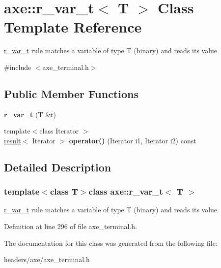 \hypertarget{classaxe_1_1r__var__t}{\section{axe\+:\+:r\+\_\+var\+\_\+t$<$ T $>$ Class Template Reference}
\label{classaxe_1_1r__var__t}
}


\hyperlink{classaxe_1_1r__var__t}{r\+\_\+var\+\_\+t} rule matches a variable of type T (binary) and reads its value  




{\ttfamily \#include $<$axe\+\_\+terminal.\+h$>$}

\subsection*{Public Member Functions}
\begin{DoxyCompactItemize}
\item 
\hypertarget{classaxe_1_1r__var__t_a07b7f7ec78fde92d94e6f348e0de9070}{{\bfseries r\+\_\+var\+\_\+t} (T \&t)}\label{classaxe_1_1r__var__t_a07b7f7ec78fde92d94e6f348e0de9070}

\item 
\hypertarget{classaxe_1_1r__var__t_a4135b872e1ea1353d0cec4cf763c9698}{{\footnotesize template$<$class Iterator $>$ }\\\hyperlink{structaxe_1_1result}{result}$<$ Iterator $>$ {\bfseries operator()} (Iterator i1, Iterator i2) const }\label{classaxe_1_1r__var__t_a4135b872e1ea1353d0cec4cf763c9698}

\end{DoxyCompactItemize}


\subsection{Detailed Description}
\subsubsection*{template$<$class T$>$class axe\+::r\+\_\+var\+\_\+t$<$ T $>$}

\hyperlink{classaxe_1_1r__var__t}{r\+\_\+var\+\_\+t} rule matches a variable of type T (binary) and reads its value 

Definition at line 296 of file axe\+\_\+terminal.\+h.



The documentation for this class was generated from the following file\+:\begin{DoxyCompactItemize}
\item 
headers/axe/axe\+\_\+terminal.\+h\end{DoxyCompactItemize}
